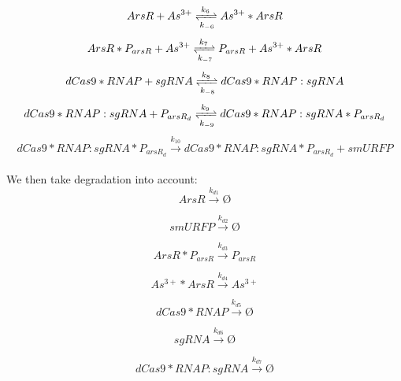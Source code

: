 \begin{equation}
ArsR +As^{3+}\xrightleftharpoons[k_{-6}]{k_6}As^{3+}*ArsR
\end{equation}
\begin{equation}
ArsR*P_{arsR} +As^{3+}\xrightleftharpoons[k_{-7}]{k_7}P_{arsR}+ As^{3+}*ArsR
\end{equation}
\begin{equation}
dCas9*RNAP+sgRNA\xrightleftharpoons[k_{-8}]{k_8} dCas9*RNAP:sgRNA
\end{equation}
\begin{equation}
dCas9*RNAP:sgRNA+P_{arsR_d}\xrightleftharpoons[k_{-9}]{k_9} dCas9*RNAP:sgRNA*P_{arsR_d}
\end{equation}
\begin{equation}
dCas9*RNAP:sgRNA*P_{arsR_d}\stackrel{k_{10}}{\longrightarrow} dCas9*RNAP:sgRNA*P_{arsR_d}+smURFP
\end{equation}
\\
We then take degradation into account:\\
\begin{equation}
ArsR\stackrel{k_{d1}}{\longrightarrow}Ø
\end{equation}

\begin{equation}
smURFP\stackrel{k_{d2}}{\longrightarrow}Ø
\end{equation}


\begin{equation}
ArsR*P_{arsR}\stackrel{k_{d3}}{\longrightarrow}P_{arsR}
\end{equation}

\begin{equation}
As^{3+}*ArsR\stackrel{k_{d4}}{\longrightarrow}As^{3+}
\end{equation}

\begin{equation}
dCas9*RNAP\stackrel{k_{d5}}{\longrightarrow}Ø
\end{equation}

\begin{equation}
sgRNA\stackrel{k_{d6}}{\longrightarrow}Ø
\end{equation}


\begin{equation}
dCas9*RNAP:sgRNA\stackrel{k_{d7}}{\longrightarrow}Ø
\end{equation}

